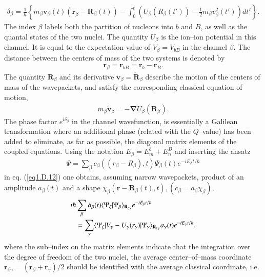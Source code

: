 \begin{subappendices}
\begin{align}\label{eq1.D.16}
\delta_\beta=\frac{1}{\hbar}\left\{m_\beta\mathbf v_\beta(t)(\mathbf r_\beta-\mathbf R_\beta(t))-\int_0^t\left(U_\beta(R_\beta(t'))-\frac{1}{2}m_\beta v^2_\beta(t')\right)dt'\right\}.
\end{align}
The index $\beta$ labels both the partition of nucleons into $b$ and $B$, as well as the quantal states of the two nuclei. The quantity $U_\beta$ is the ion--ion potential in this channel. It is equal to the expectation value of $V_\beta=V_{bB}$ in the channel $\beta$. The distance between the centers of mass of the two systems is denoted by
\begin{align}\label{eq1.D.17}
\mathbf r_\beta=\mathbf r_{bB}=\mathbf r_b-\mathbf r_B.
\end{align}
The quantity $\mathbf R_\beta$ and its derivative $\mathbf v_\beta=\mathbf{\dot R}_\beta$ describe the motion of the centers of mass of the wavepackets, and satisfy the corresponding classical equation of motion,
\begin{align}\label{eq1.D.18}
m_\beta\mathbf{\dot v}_\beta=-\boldsymbol\nabla U_\beta(\mathbf R_\beta).
\end{align}
The phase factor $e^{i\delta_\beta}$ in the channel wavefunction, is essentially a Galilean transformation where an additional phase (related with the $Q$--value) has been added to eliminate, as far as possible, the diagonal matrix elements of the coupled equations. Using the notation $E_\beta=E_m^b+E_n^B$ and inserting the ansatz
\begin{align}\label{eq1.D.19}
\Psi=\sum_{\beta}c_\beta((r_\beta-R_\beta),t)\Psi_\beta(t)e^{-iE_\beta t/\hbar}
\end{align}
in eq. (\ref{eq1.D.12}) one obtains, assuming narrow wavepackets, product of an amplitude $a_\beta(t)$ and a shape $\chi_\beta(\mathbf r-\mathbf R_\beta(t),t), (c_\beta=a_\beta\chi_\beta)$,
\begin{align}\label{eq1.D.20}
\nonumber i\hbar & \sum_{\beta}\dot a_\beta(t)\langle {\Psi_\xi|\Psi_\beta} \rangle_{\mathbf R_{\xi\gamma}}e^{-iE_\beta t/\hbar}\\
&=\sum_{\gamma}\langle {\Psi_\xi|V_\gamma-U_\gamma(r_\gamma)|\Psi_\gamma} \rangle_{\mathbf R_{\xi\gamma}}a_\gamma(t)e^{-iE_\gamma t/\hbar}.
\end{align}
where the sub--index on the matrix elements indicate that the integration over the degree of freedom of the two nuclei, the average center--of--mass coordinate $\mathbf r_{\beta\gamma}=(\mathbf r_\beta+\mathbf r_\gamma)/2$ should be identified with the average classical coordinate, i.e.

\end{subappendices}
